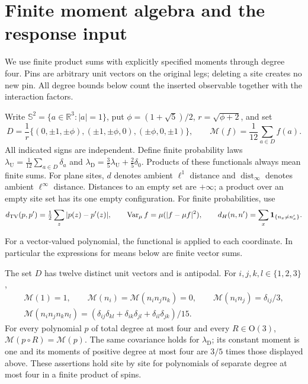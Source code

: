 \section{Finite moment algebra and the response input}\label{s:moments}

We use finite product sums with explicitly specified moments through degree
four. Pins are arbitrary unit vectors on the original legs; deleting a
site creates no new pin. All degree bounds below count the inserted
observable together with the interaction factors.

\begin{definition}\label{d:moment}
Write \(\mathbb S^2=\{a\in\mathbb R^3:|a|=1\}\), put
\(\phi=(1+\sqrt5)/2\), \(r=\sqrt{\phi+2}\), and set
\[
 D=\frac1r\{(0,\pm1,\pm\phi),(\pm1,\pm\phi,0),(\pm\phi,0,\pm1)\},
 \qquad
 \mathcal M(f)=\frac1{12}\sum_{a\in D}f(a).
\]
All indicated signs are independent. Define finite probability laws
\(\lambda_{\mathrm U}=\frac1{12}\sum_{a\in D}\delta_a\) and
\(\lambda_{\mathrm D}=\frac35\lambda_{\mathrm U}+\frac25\delta_0\).
Products of these functionals always mean finite sums.
For plane sites, \(d\) denotes ambient \(\ell^1\) distance and
\(\operatorname{dist}_\infty\) denotes ambient \(\ell^\infty\) distance.
Distances to an empty set are \(+\infty\); a product over an empty site
set has its one empty configuration. For finite probabilities, use
\[
 d_{\rm TV}(p,p')=\tfrac12\sum_z|p(z)-p'(z)|,\qquad
 \operatorname{Var}_\mu f=\mu(|f-\mu f|^2),\qquad
 d_H(n,n')=\sum_x\mathbf1_{\{n_x\ne n'_x\}} .
\]
\end{definition}

For a vector-valued polynomial, the functional is applied to each
coordinate. In particular the expressions for means below are finite
vector sums.

\begin{lemma}\label{l:moments}
The set \(D\) has twelve distinct unit vectors and is antipodal.
For \(i,j,k,l\in\{1,2,3\}\),
\[
 \begin{gathered}
 \mathcal M(1)=1,\qquad \mathcal M(n_i)=\mathcal M(n_in_jn_k)=0,\qquad
 \mathcal M(n_in_j)=\delta_{ij}/3,\\
 \mathcal M(n_in_jn_kn_l)=
 (\delta_{ij}\delta_{kl}+\delta_{ik}\delta_{jl}+\delta_{il}\delta_{jk})/15.
 \end{gathered}
\]
For every polynomial \(p\) of total degree at most four and every
\(R\in\mathrm O(3)\), \(\mathcal M(p\circ R)=\mathcal M(p)\).
The same covariance holds for \(\lambda_{\mathrm D}\); its constant
moment is one and its moments of positive degree at most four are
\(3/5\) times those displayed above.
These assertions hold site by site for polynomials of separate degree
at most four in a finite product of spins.
\end{lemma}

